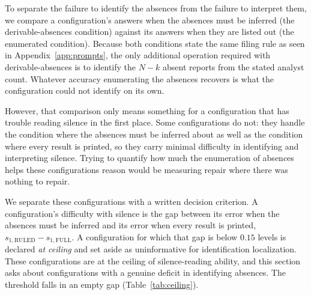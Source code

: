 \documentclass{article}
\theoremstyle{plain}
\theoremstyle{definition}
\theoremstyle{remark}
\begin{document}
To separate the failure to identify the absences from the failure to interpret
them, we compare a configuration's answers when the absences must be inferred
(the derivable-absences condition) against its answers when they are listed out
(the enumerated condition). 
Because both conditions state the same filing rule as seen in Appendix~\ref{app:prompts},
the only additional operation 
required with derivable-absences is to identify the $N-k$ absent reports from the stated 
analyst count. Whatever accuracy enumerating the absences recovers is what the
configuration could not identify on its own. 

However, that comparison only means something
for a configuration that has trouble reading silence in the first place. Some
configurations do not: they handle the condition where the absences must be
inferred about as well as the condition where every result is printed, so they carry minimal
difficulty in identifying and interpreting silence. Trying to quantify how much the 
enumeration of absences helps these configurations reason would be measuring 
repair where there was nothing to repair.

We separate these configurations with a written decision criterion. A configuration's difficulty with silence is the gap
between its error when the absences must be inferred and its error when every
result is printed, $s_{1,\mathrm{RULED}} - s_{1,\mathrm{FULL}}$. A configuration
for which that gap is below $0.15$ levels is declared \emph{at ceiling} and set
aside as uninformative for identification localization. These
configurations are at the ceiling of silence-reading ability, and this section
asks about configurations with a genuine deficit in identifying absences. 
The threshold falls in an empty gap (Table~\ref{tab:ceiling}).
\end{document}
